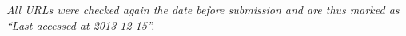 \clearemptydoublepage

\label{chapter:Bibliography}

\emph{All URLs were checked again the date before submission and are thus marked as ``Last accessed at 2013-12-15''.}